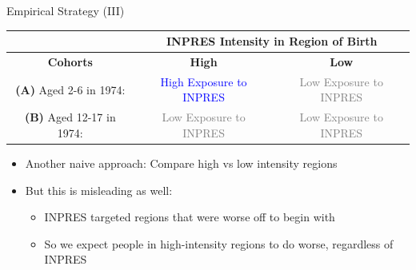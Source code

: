 \documentclass[11pt,notes=hide,aspectratio=169,mathserif]{beamer}
\begin{document}
\begin{frame}{Empirical Strategy (III)}
\begin{table}
\scriptsize
\centering
\begin{tabular}{|c|c|c|}
\hline
    & \multicolumn{2}{|c|}{\textbf{INPRES Intensity in Region of Birth}}  \\
    \hline
    \textbf{Cohorts} & \textbf{High} & \textbf{Low}  \\
\hline 
\textbf{(A)} Aged 2-6 in 1974:  & \rule{0pt}{15pt}  \textcolor{blue}{High Exposure to INPRES} & \rule{0pt}{15pt} \textcolor{gray}{Low Exposure to INPRES} \\
\hline
\textbf{(B)} Aged 12-17 in 1974:  & \rule{0pt}{15pt} \textcolor{gray}{Low Exposure to INPRES} & \rule{0pt}{15pt} \textcolor{gray}{Low Exposure to INPRES} \\
\hline
\end{tabular}
\end{table}

\begin{itemize}
     \item  Another naive approach: Compare high vs low intensity regions 
     \item  But this is misleading as well:
    \begin{itemize}
         \item  INPRES targeted regions that were worse off to begin with
         \item  So we expect people in high-intensity regions to do worse, regardless of INPRES
    \end{itemize} 
\end{itemize}
\end{frame}
\end{document}
